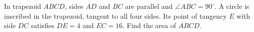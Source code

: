 In trapezoid $ABCD$, sides $AD$ and $BC$ are parallel and $\angle ABC=90^\circ$. A circle is inscribed in the trapezoid, tangent to all four sides. Its point of tangency $E$ with side $DC$ satisfies $DE=4$ and $EC=16$. Find the area of $ABCD$.
